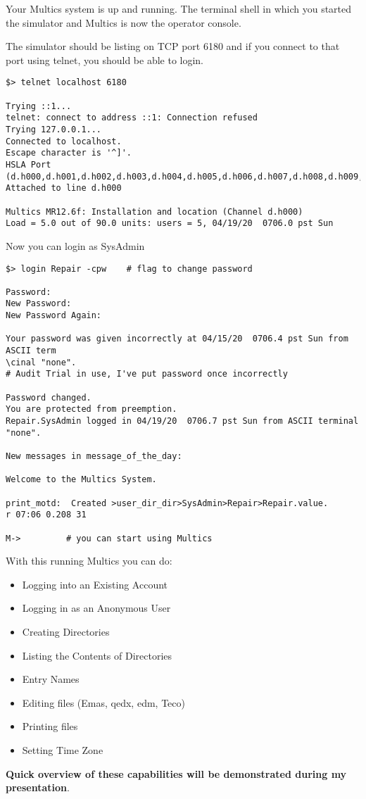Your Multics system is up and running. The terminal shell in which you started the simulator and Multics is now the operator console.


The simulator should be listing on TCP port 6180 and if you connect to that port using telnet, you should be able to login. 

\begin{lstlisting}
$> telnet localhost 6180

Trying ::1...
telnet: connect to address ::1: Connection refused
Trying 127.0.0.1...
Connected to localhost.
Escape character is '^]'.
HSLA Port (d.h000,d.h001,d.h002,d.h003,d.h004,d.h005,d.h006,d.h007,d.h008,d.h009,d.h010,d.h011,d.h012,d.h013,d.h014,d.h015,d.h016,d.h017,d.h018,d.h019,d.h020,d.h021,d.h022,d.h023,d.h024,d.h025,d.h026,d.h027,d.h028,d.h029,d.h030,d.h031)? 
Attached to line d.h000

Multics MR12.6f: Installation and location (Channel d.h000)
Load = 5.0 out of 90.0 units: users = 5, 04/19/20  0706.0 pst Sun
\end{lstlisting}

Now you can login as SysAdmin

\begin{lstlisting}
$> login Repair -cpw    # flag to change password

Password:
New Password:
New Password Again:

Your password was given incorrectly at 04/15/20  0706.4 pst Sun from ASCII term
\cinal "none".      
# Audit Trial in use, I've put password once incorrectly

Password changed.
You are protected from preemption.
Repair.SysAdmin logged in 04/19/20  0706.7 pst Sun from ASCII terminal "none".

New messages in message_of_the_day:

Welcome to the Multics System.

print_motd:  Created >user_dir_dir>SysAdmin>Repair>Repair.value.
r 07:06 0.208 31

M->         # you can start using Multics
\end{lstlisting}

With this running Multics you can do:

\begin{itemize}
    \item Logging into an Existing Account
    \item Logging in as an Anonymous User
    \item Creating Directories
    \item Listing the Contents of Directories
    \item Entry Names
    \item Editing files (Emas, qedx, edm, Teco)
    \item Printing files
    \item Setting Time Zone
\end{itemize}

\textbf{Quick overview of these capabilities will be demonstrated during my presentation}.


